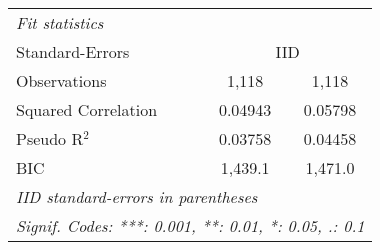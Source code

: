 \begin{tabular}{lcc}
   \midrule
   \emph{Fit statistics}\\
   Standard-Errors & \multicolumn{2}{c}{IID} \\ 
   Observations                          & 1,118         & 1,118\\  
   Squared Correlation                   & 0.04943       & 0.05798\\  
   Pseudo R$^2$                          & 0.03758       & 0.04458\\  
   BIC                                   & 1,439.1       & 1,471.0\\  
   \midrule \midrule
   \multicolumn{3}{l}{\emph{IID standard-errors in parentheses}}\\
   \multicolumn{3}{l}{\emph{Signif. Codes: ***: 0.001, **: 0.01, *: 0.05, .: 0.1}}\\
\end{tabular}
\par\endgroup


